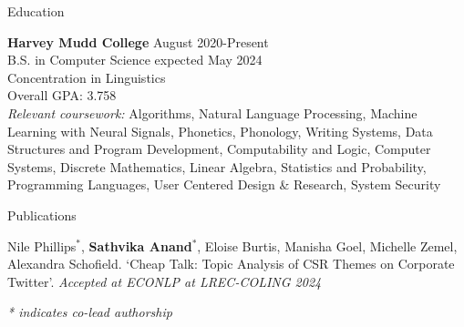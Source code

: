 \documentclass[
	11pt, %
]{resume} %
\begin{document}

\begin{rSection}{Education}
	
	\textbf{Harvey Mudd College } \hfill August 2020-Present \\ 
	B.S. in Computer Science expected May 2024\\
	Concentration in Linguistics \\
        Overall GPA: 3.758
 \smallskip \\
\textit{Relevant coursework:} Algorithms, Natural Language Processing, Machine Learning with Neural Signals, Phonetics, Phonology, Writing Systems, Data Structures and Program Development, Computability and Logic, Computer Systems, Discrete Mathematics, Linear Algebra, Statistics and Probability, Programming Languages, User Centered Design \& Research, System Security

	
\end{rSection}

\begin{rSection}{Publications}

    Nile Phillips$^{*}$, \textbf{Sathvika Anand$^{*}$}, Eloise Burtis, Manisha Goel, Michelle Zemel, Alexandra Schofield. `Cheap Talk: Topic Analysis of CSR Themes on Corporate Twitter'. \textsl{Accepted at ECONLP at LREC-COLING 2024}
    
    \textit{* indicates co-lead authorship}
\end{rSection}
\end{document}
